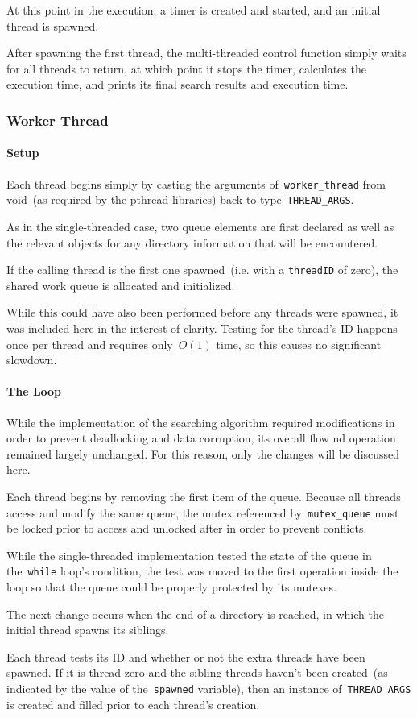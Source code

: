 \documentclass{article}
\newcommand{\clst}[2]{
	\begin{center}
	\parbox{.6\textwidth}{
	}
	\end{center}
}
\newcommand{\ttt}[1]{\texttt{#1}}
\begin{document}
At this point in the execution, a timer is created and started, and an initial
thread is spawned.
%
\clst{228}{237}
%
After spawning the first thread, the multi-threaded control function simply
waits for all threads to return, at which point it stops the timer, calculates
the execution time, and prints its final search results and execution time.
%
\clst{239}{259}

\subsubsection{Worker Thread}
\paragraph{Setup}
Each thread begins simply by casting the arguments of~\ttt{worker\_thread} from
void~(as required by the pthread libraries) back to type~\ttt{THREAD\_ARGS}.
%
\clst{263}{271}
%
As in the single-threaded case, two queue elements are first declared as well
as the relevant objects for any directory information that will be encountered.

If the calling thread is the first one spawned~(i.e. with a \ttt{threadID} of
zero), the shared work queue is allocated and initialized.
%
\clst{274}{288}
%
While this could have also been performed before any threads were spawned, it
was included here in the interest of clarity.  Testing for the thread's ID
happens once per thread and requires only~$O(1)$ time, so this causes no
significant slowdown.

\paragraph{The Loop}
While the implementation of the searching algorithm required modifications in
order to prevent deadlocking and data corruption, its overall flow nd operation
remained largely unchanged.  For this reason, only the changes will be
discussed here.

Each thread begins by removing the first item of the queue.  Because all threads access
and modify the same queue, the mutex referenced by~\ttt{mutex\_queue} must be
locked prior to access and unlocked after in order to prevent conflicts.
%
\clst{291}{298}
%
While the single-threaded implementation tested the state of the queue in
the~\ttt{while} loop's condition, the test was moved to the first operation
inside the loop so that the queue could be properly protected by its mutexes.

The next change occurs when the end of a directory is reached, in which the
initial thread spawns its siblings.
%
\clst{329}{355}
%
Each thread tests its ID and whether or not the extra threads have been
spawned.  If it is thread zero and the sibling threads haven't been created~(as
indicated by the value of the~\ttt{spawned} variable), then an instance
of~\ttt{THREAD\_ARGS} is created and filled prior to each thread's creation.
\end{document}
